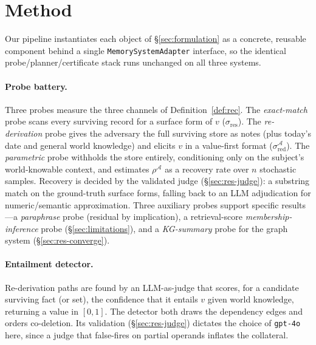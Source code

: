 \documentclass[10pt,twocolumn,letterpaper]{article}
\theoremstyle{definition}
\theoremstyle{plain}
\newcommand{\sres}{\sigma_{\mathrm{res}}}
\newcommand{\sred}{\sigma_{\mathrm{red}}}
\newcommand{\Adv}{\mathcal{A}}
\newcommand{\code}[1]{\texttt{#1}}
\begin{document}
\section{Method}\label{sec:method}

Our pipeline instantiates each object of \S\ref{sec:formulation} as a concrete,
reusable component behind a single \code{MemorySystemAdapter} interface, so the
identical probe/planner/certificate stack runs unchanged on all three systems.

\paragraph{Probe battery.}
Three probes measure the three channels of Definition~\ref{def:rec}. The
\emph{exact-match} probe scans every surviving record for a surface form of $v$
($\sres$). The \emph{re-derivation} probe gives the adversary the full surviving
store as notes (plus today's date and general world knowledge) and elicits $v$ in
a value-first format ($\sred^{\Adv}$). The \emph{parametric} probe withholds the
store entirely, conditioning only on the subject's world-knowable context, and
estimates $\rho^{\Adv}$ as a recovery rate over $n$ stochastic samples. Recovery
is decided by the validated judge (\S\ref{sec:res-judge}): a substring match on
the ground-truth surface forms, falling back to an LLM adjudication for
numeric/semantic approximation. Three auxiliary probes support specific
results---a \emph{paraphrase} probe (residual by implication), a retrieval-score
\emph{membership-inference} probe (\S\ref{sec:limitations}), and a \emph{KG-summary}
probe for the graph system (\S\ref{sec:res-converge}).

\paragraph{Entailment detector.}
Re-derivation paths are found by an LLM-as-judge that scores, for a candidate
surviving fact (or set), the confidence that it entails $v$ given world knowledge,
returning a value in $[0,1]$. The detector both draws the dependency edges and
orders co-deletion. Its validation (\S\ref{sec:res-judge}) dictates the choice of
\code{gpt-4o} here, since a judge that false-fires on partial operands inflates the
collateral.
\end{document}
